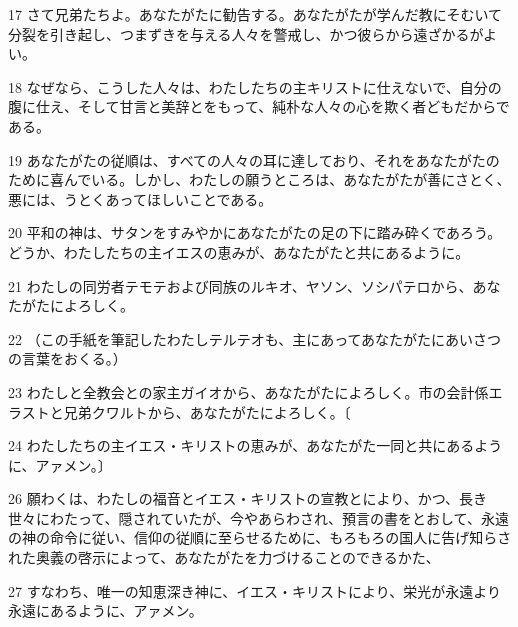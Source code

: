 \par 17 さて兄弟たちよ。あなたがたに勧告する。あなたがたが学んだ教にそむいて分裂を引き起し、つまずきを与える人々を警戒し、かつ彼らから遠ざかるがよい。
\par 18 なぜなら、こうした人々は、わたしたちの主キリストに仕えないで、自分の腹に仕え、そして甘言と美辞とをもって、純朴な人々の心を欺く者どもだからである。
\par 19 あなたがたの従順は、すべての人々の耳に達しており、それをあなたがたのために喜んでいる。しかし、わたしの願うところは、あなたがたが善にさとく、悪には、うとくあってほしいことである。
\par 20 平和の神は、サタンをすみやかにあなたがたの足の下に踏み砕くであろう。どうか、わたしたちの主イエスの恵みが、あなたがたと共にあるように。
\par 21 わたしの同労者テモテおよび同族のルキオ、ヤソン、ソシパテロから、あなたがたによろしく。
\par 22 （この手紙を筆記したわたしテルテオも、主にあってあなたがたにあいさつの言葉をおくる。）
\par 23 わたしと全教会との家主ガイオから、あなたがたによろしく。市の会計係エラストと兄弟クワルトから、あなたがたによろしく。〔
\par 24 わたしたちの主イエス・キリストの恵みが、あなたがた一同と共にあるように、アァメン。〕
\par 26 願わくは、わたしの福音とイエス・キリストの宣教とにより、かつ、長き世々にわたって、隠されていたが、今やあらわされ、預言の書をとおして、永遠の神の命令に従い、信仰の従順に至らせるために、もろもろの国人に告げ知らされた奥義の啓示によって、あなたがたを力づけることのできるかた、
\par 27 すなわち、唯一の知恵深き神に、イエス・キリストにより、栄光が永遠より永遠にあるように、アァメン。


